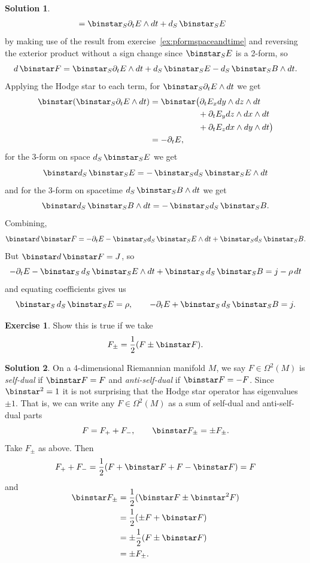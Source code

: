 \documentclass[11pt, a4paper]{report}
\theoremstyle{definition}
\newtheorem{exercise}{Exercise}[part]
\newtheorem{solution}{Solution}[part]
\newenvironment{ex}{\begin{exercise}}{\end{exercise}\pagebreak[1]}
\newenvironment{sol}{\begin{solution}}{\end{solution}\pagebreak[3]}
\newcommand*{\op}[1]{\ensuremath\mathop{}\mathopen{}#1}
\renewcommand*{\d}{\op{d}}
\renewcommand*{\star}{\op{\binstar}\mathord{}}
\begin{document}
\begin{sol}
\begin{align*}
        &= \star_S \partial_t E \wedge dt + d_S \star_S E
\end{align*}
by making use of the result from exercise~\ref{ex:pformspaceandtime} and reversing the exterior product without a sign change since $\star_S E$ is a 2-form, so
\[
    d \star F = \star_S \partial_t E \wedge dt + d_S \star_S E - d_S \star_S B \wedge dt.
\]
Applying the Hodge star to each term, for $\star_S \partial_t E \wedge dt$ we get
\begin{align*}
    \star (\star_S \partial_t E \wedge dt)
        &= \star \bigl(\partial_t E_x dy \wedge dz \wedge dt \\
        &\phantom{= \star \;\; } + \partial_t E_y dz \wedge dx \wedge dt \\
        &\phantom{= \star \;\; } + \partial_t E_z dx \wedge dy \wedge dt \bigr) \\
        &= - \partial_t E,
\end{align*}
for the 3-form on space $d_S \star_S E$ we get
\[
    \star d_S \star_S E = - \star_S d_S \star_S E \wedge dt
\]
and for the 3-form on spacetime $d_S \star_S B \wedge dt$ we get
\[
    \star d_S \star_S B \wedge dt = - \star_S d_S \star_S B.
\]
Combining,
\[
    \star d \star F = - \partial_t E - \star_S d_S \star_S E \wedge dt + \star_S d_S \star_S B.
\]
But $\star d \star F = J$, so
\[
    - \partial_t E - \star_S \d_S \star_S E \wedge dt + \star_S \d_S \star_S B = j - \rho \d t
\]
and equating coefficients gives us
\[
    \star_S \d_S \star_S E = \rho, \qquad
    - \partial_t E + \star_S \d_S \star_S B = j.
\]

\end{sol}

\begin{ex}

Show this is true if we take
\[
    F_\pm = \frac{1}{2} (F \pm \star F).
\]

\end{ex}

\begin{sol}

On a 4-dimensional Riemannian manifold $M$, we say $F \in \Omega^2(M)$ is \emph{self-dual} if $\star F = F$ and \emph{anti-self-dual} if $\star F = - F$.
Since $\star^2 = 1$ it is not surprising that the Hodge star operator has eigenvalues $\pm 1$. That is, we can write any $F \in \Omega^2(M)$ as a sum of self-dual and anti-self-dual parts
\[
    F = F_+ + F_-, \qquad
    \star F_\pm = \pm F_\pm.
\]
Take $F_\pm$ as above. Then
\[
    F_+ + F_- = \frac{1}{2}(F + \star F + F - \star F) = F
\]
and
\begin{align*}
    \SwapAboveDisplaySkip
    \star F_\pm &= \frac{1}{2} (\star F \pm \star^2 F) \\
                &= \frac{1}{2} (\pm F + \star F) \\
                &= \pm \frac{1}{2} (F \pm \star F) \\
                &= \pm F_\pm.
\end{align*}

\end{sol}
\end{document}
